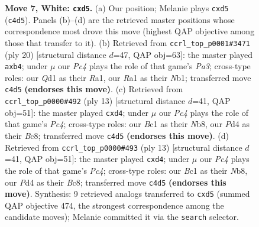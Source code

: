 \documentclass[11pt]{article}
\begin{document}
\begin{figure}[p]
\caption{\textbf{Move 7, White: \texttt{cxd5}.} (a) Our position; Melanie plays \texttt{cxd5} (\texttt{c4d5}). Panels (b)--(d) are the retrieved master positions whose correspondence most drove this move (highest QAP objective among those that transfer to it). (b) Retrieved from \texttt{ccrl\_top\_p0001\#3471} (ply 20) [structural distance $d$=47, QAP obj=63]: the master played \texttt{axb4}; under $\mu$ our \emph{Pc4} plays the role of that game's \emph{Pa3}; cross-type roles: our \emph{Q}d1 as their \emph{R}a1, our \emph{R}a1 as their \emph{N}b1; transferred move \texttt{c4d5} \textbf{(endorses this move)}. (c) Retrieved from \texttt{ccrl\_top\_p0000\#492} (ply 13) [structural distance $d$=41, QAP obj=51]: the master played \texttt{cxd4}; under $\mu$ our \emph{Pc4} plays the role of that game's \emph{Pc4}; cross-type roles: our \emph{B}c1 as their \emph{N}b8, our \emph{P}d4 as their \emph{B}c8; transferred move \texttt{c4d5} \textbf{(endorses this move)}. (d) Retrieved from \texttt{ccrl\_top\_p0000\#493} (ply 13) [structural distance $d$=41, QAP obj=51]: the master played \texttt{cxd4}; under $\mu$ our \emph{Pc4} plays the role of that game's \emph{Pc4}; cross-type roles: our \emph{B}c1 as their \emph{N}b8, our \emph{P}d4 as their \emph{B}c8; transferred move \texttt{c4d5} \textbf{(endorses this move)}. Synthesis: 9 retrieved analogs transferred to \texttt{cxd5} (summed QAP objective 474, the strongest correspondence among the candidate moves); Melanie committed it via the \texttt{search} selector.}
\label{fig:thought-m12}
\end{figure}

\clearpage
\end{document}
